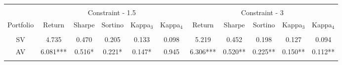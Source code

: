 \begin{tabular}{@{\extracolsep{5pt}} ccccccccccc} 
\hline \\[-1.8ex] 
& \multicolumn{5}{c}{Constraint - 1.5} &\multicolumn{5}{c}{Constraint - 3}\\
\cline{2-6} \cline{7-11}
Portfolio & Return & Sharpe & Sortino & Kappa$_{3}$ & Kappa$_{4}$ & Return & Sharpe & Sortino & Kappa$_{3}$ & Kappa$_{4}$ \\ 
\hline \\[-1.8ex] 
SV & 4.735 & 0.470 & 0.205 & 0.133 & 0.098 & 5.219 & 0.452 & 0.198 & 0.127 & 0.094 \\ 
AV & 6.081*** & 0.516* & 0.221* & 0.147* & 0.945 & 6.306*** & 0.520** & 0.225** & 0.150** & 0.112** \\ 
\hline\\
\end{tabular}
